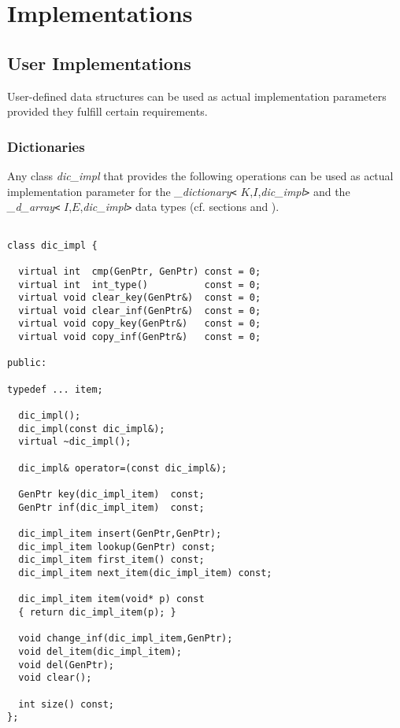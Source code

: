 
\chapter{Implementations}\label{Implementations}


\section{User Implementations}\label{User Implementations}

User-defined data structures can be used as actual implementation parameters provided 
they fulfill certain requirements.

\subsection{Dictionaries}\label{User Implementations Dictionaries}

Any class {\it dic\_impl} that provides the following operations can be used as 
actual implementation parameter for the 
{\it \_dictionary}{\tt <} $K$,$I$,{\it dic\_impl}{\tt >} 
and the {\it \_d\_array}{\tt <} $I$,$E$,{\it dic\_impl}{\tt >} 
data types (cf. sections  and ).

\begin{verbatim}

class dic_impl {

  virtual int  cmp(GenPtr, GenPtr) const = 0;
  virtual int  int_type()          const = 0;
  virtual void clear_key(GenPtr&)  const = 0;
  virtual void clear_inf(GenPtr&)  const = 0;
  virtual void copy_key(GenPtr&)   const = 0;
  virtual void copy_inf(GenPtr&)   const = 0;

public:

typedef ... item;

  dic_impl();
  dic_impl(const dic_impl&);
  virtual ~dic_impl();

  dic_impl& operator=(const dic_impl&);

  GenPtr key(dic_impl_item)  const;
  GenPtr inf(dic_impl_item)  const;

  dic_impl_item insert(GenPtr,GenPtr);
  dic_impl_item lookup(GenPtr) const;
  dic_impl_item first_item() const;
  dic_impl_item next_item(dic_impl_item) const;

  dic_impl_item item(void* p) const 
  { return dic_impl_item(p); }

  void change_inf(dic_impl_item,GenPtr);
  void del_item(dic_impl_item);
  void del(GenPtr);
  void clear();

  int size() const;
};
\end{verbatim}
\newpage

